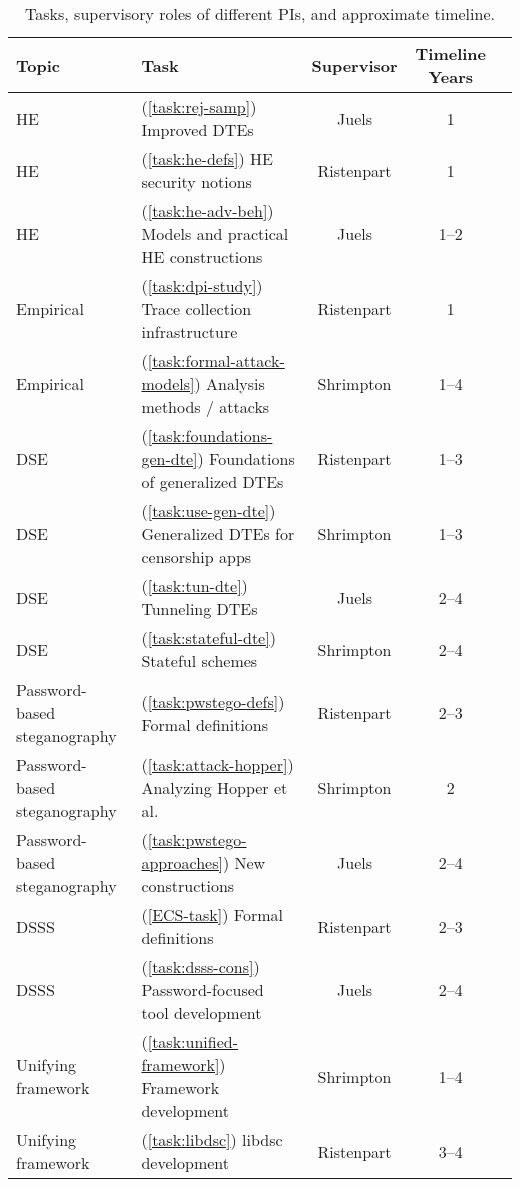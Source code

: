 \begin{table}[th]
\small
\centering
\begin{tabular}{|l|l|c|c|c|}
\hline
{\bf Topic} & {\bf Task} & {\bf Supervisor} & {\bf Timeline Years} \\
\hline\hline
HE & (\ref{task:rej-samp}) Improved DTEs & Juels & 1 \\
HE & (\ref{task:he-defs}) HE security notions & Ristenpart & 1 \\
HE & (\ref{task:he-adv-beh}) Models and practical HE constructions& Juels & 1--2 \\
\hline
Empirical & (\ref{task:dpi-study}) Trace collection infrastructure & Ristenpart & 1 \\
Empirical & (\ref{task:formal-attack-models}) Analysis methods / attacks & Shrimpton & 1--4 \\
\hline
DSE & (\ref{task:foundations-gen-dte}) Foundations of generalized DTEs& Ristenpart & 1--3 \\
DSE & (\ref{task:use-gen-dte}) Generalized DTEs for censorship apps & Shrimpton & 1--3 \\
DSE & (\ref{task:tun-dte}) Tunneling DTEs & Juels & 2--4 \\
DSE & (\ref{task:stateful-dte}) Stateful schemes & Shrimpton & 2--4 \\
\hline
Password-based steganography & (\ref{task:pwstego-defs}) Formal definitions & Ristenpart & 2--3 \\
Password-based steganography & (\ref{task:attack-hopper}) Analyzing Hopper et al.~& Shrimpton & 2 \\
Password-based steganography & (\ref{task:pwstego-approaches}) New constructions & Juels & 2--4 \\
\hline
DSSS & (\ref{ECS-task}) Formal definitions & Ristenpart & 2--3 \\
DSSS & (\ref{task:dsss-cons}) Password-focused tool development & Juels & 2--4 \\
\hline
Unifying framework & (\ref{task:unified-framework}) Framework development  & Shrimpton & 1--4 \\
Unifying framework & (\ref{task:libdsc}) libdsc development & Ristenpart & 3--4 \\
\hline
\end{tabular}
\caption{Tasks, supervisory roles of different PIs, and approximate timeline.}
\label{table:tasks}
\end{table}

